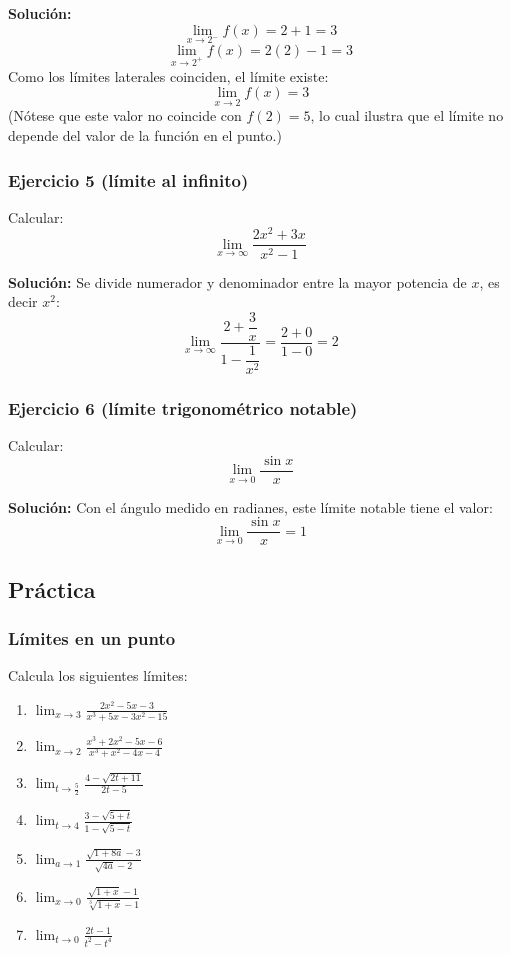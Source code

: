 \documentclass[12pt]{article}
\begin{document}
\textbf{Solución:}
\[
\lim_{x \to 2^-} f(x) = 2 + 1 = 3
\]
\[
\lim_{x \to 2^+} f(x) = 2(2) - 1 = 3
\]
Como los límites laterales coinciden, el límite existe:
\[
\lim_{x \to 2} f(x) = 3
\]
(Nótese que este valor no coincide con $f(2) = 5$, lo cual ilustra que el límite no depende del valor de la función en el punto.)



\subsubsection{Ejercicio 5 (límite al infinito)}


Calcular:
\[
\lim_{x \to \infty} \frac{2x^2 + 3x}{x^2 - 1}
\]

\textbf{Solución:}
Se divide numerador y denominador entre la mayor potencia de $x$, es decir $x^2$:
\[
\lim_{x \to \infty} \frac{2 + \dfrac{3}{x}}{1 - \dfrac{1}{x^2}} = \frac{2 + 0}{1 - 0} = 2
\]



\subsubsection{Ejercicio 6 (límite trigonométrico notable)}


Calcular:
\[
\lim_{x \to 0} \frac{\sin x}{x}
\]

\textbf{Solución:}
Con el ángulo medido en radianes, este límite notable tiene el valor:
\[
\lim_{x \to 0} \frac{\sin x}{x} = 1
\]



\subsection{Práctica}

\subsubsection{Límites en un punto}


Calcula los siguientes límites:
\begin{enumerate}
    \item $\displaystyle \lim_{x \to 3} \frac{2x^2 - 5x - 3}{x^3 + 5x - 3x^2 - 15}$
    \item $\displaystyle \lim_{x \to 2} \frac{x^3 + 2x^2 - 5x - 6}{x^3 + x^2 - 4x - 4}$
    \item $\displaystyle \lim_{t \to \frac{5}{2}} \frac{4 - \sqrt{2t + 11}}{2t - 5}$
    \item $\displaystyle \lim_{t \to 4} \frac{3 - \sqrt{5 + t}}{1 - \sqrt{5 - t}}$
    \item $\displaystyle \lim_{a \to 1} \frac{\sqrt{1 + 8a} - 3}{\sqrt{4a} - 2}$
    \item $\displaystyle \lim_{x \to 0} \frac{\sqrt{1 + x} - 1}{\sqrt[3]{1 + x} - 1}$
    \item $\displaystyle \lim_{t \to 0} \frac{2t - 1}{t^2 - t^4}$
\end{enumerate}
\end{document}
